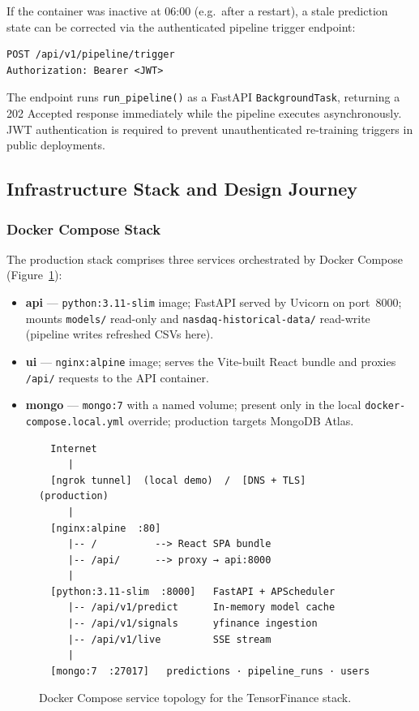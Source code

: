 \documentclass[12pt, a4paper]{article}
\begin{document}
If the container was inactive at 06:00 (e.g.\ after a restart), a
stale prediction state can be corrected via the authenticated
pipeline trigger endpoint:

\begin{verbatim}
POST /api/v1/pipeline/trigger
Authorization: Bearer <JWT>
\end{verbatim}

The endpoint runs \texttt{run\_pipeline()} as a FastAPI
\texttt{BackgroundTask}, returning a 202 Accepted response
immediately while the pipeline executes asynchronously.
JWT authentication is required to prevent unauthenticated
re-training triggers in public deployments.

\subsection{Infrastructure Stack and Design Journey}

\subsubsection{Docker Compose Stack}

The production stack comprises three services orchestrated by
Docker Compose (Figure~\ref{fig:stack}):

\begin{itemize}
  \item \textbf{api} --- \texttt{python:3.11-slim} image;
    FastAPI served by Uvicorn on port~8000; mounts
    \texttt{models/} read-only and \texttt{nasdaq-historical-data/}
    read-write (pipeline writes refreshed CSVs here).
  \item \textbf{ui} --- \texttt{nginx:alpine} image; serves the
    Vite-built React bundle and proxies \texttt{/api/} requests
    to the API container.
  \item \textbf{mongo} --- \texttt{mongo:7} with a named volume;
    present only in the local \texttt{docker-compose.local.yml}
    override; production targets MongoDB Atlas.
\end{itemize}

\begin{figure}[h]
\centering
\begin{verbatim}
  Internet
     |
  [ngrok tunnel]  (local demo)  /  [DNS + TLS]  (production)
     |
  [nginx:alpine  :80]
     |-- /          --> React SPA bundle
     |-- /api/      --> proxy → api:8000
     |
  [python:3.11-slim  :8000]   FastAPI + APScheduler
     |-- /api/v1/predict      In-memory model cache
     |-- /api/v1/signals      yfinance ingestion
     |-- /api/v1/live         SSE stream
     |
  [mongo:7  :27017]   predictions · pipeline_runs · users
\end{verbatim}
\caption{Docker Compose service topology for the TensorFinance stack.}
\label{fig:stack}
\end{figure}
\end{document}
